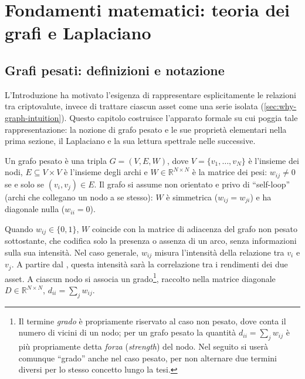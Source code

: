 \chapter{Fondamenti matematici: teoria dei grafi e Laplaciano}
\label{ch:mathematical-foundations}

\section{Grafi pesati: definizioni e notazione}
\label{sec:weighted-graphs-notation}

L'Introduzione ha motivato l'esigenza di rappresentare esplicitamente le relazioni tra criptovalute, invece di trattare ciascun asset come una serie isolata (\cref{sec:why-graph-intuition}). Questo capitolo costruisce l'apparato formale su cui poggia tale rappresentazione: la nozione di grafo pesato e le sue proprietà elementari nella prima sezione, il Laplaciano e la sua lettura spettrale nelle successive.
\begin{definition}
\label{def:weighted-graph}
Un grafo pesato è una tripla $G = (V, E, W)$, dove $V = \{v_1, \dots, v_N\}$ è l'insieme dei nodi, $E \subseteq V \times V$ è l'insieme degli archi e $W \in \mathbb{R}^{N \times N}$ è la matrice dei pesi: $w_{ij} \neq 0$ se e solo se $(v_i, v_j) \in E$. Il grafo si assume non orientato e privo di \enquote{self-loop} (archi che collegano un nodo a se stesso): $W$ è simmetrica ($w_{ij} = w_{ji}$) e ha diagonale nulla ($w_{ii} = 0$).
\end{definition}

Quando $w_{ij} \in \{0,1\}$, $W$ coincide con la matrice di adiacenza del grafo non pesato sottostante, che codifica solo la presenza o assenza di un arco, senza informazioni sulla sua intensità. Nel caso generale, $w_{ij}$ misura l'intensità della relazione tra $v_i$ e $v_j$. A partire dal , questa intensità sarà la correlazione tra i rendimenti dei due asset. A ciascun nodo si associa un grado\footnote{Il termine \emph{grado} è propriamente riservato al caso non pesato, dove conta il numero di vicini di un nodo; per un grafo pesato la quantità $d_{ii} = \sum_j w_{ij}$ è più propriamente detta \emph{forza} (\emph{strength}) del nodo. Nel seguito si userà comunque \enquote{grado} anche nel caso pesato, per non alternare due termini diversi per lo stesso concetto lungo la tesi.}, raccolto nella matrice diagonale $D \in \mathbb{R}^{N\times N}$, $d_{ii} = \sum_{j} w_{ij}$.

